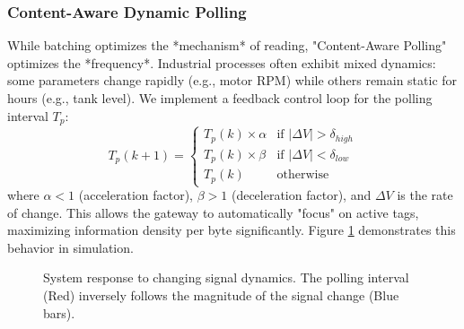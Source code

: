 \documentclass[journal]{IEEEtran}
\begin{document}
\subsubsection{Content-Aware Dynamic Polling}
While batching optimizes the *mechanism* of reading, "Content-Aware Polling" optimizes the *frequency*. Industrial processes often exhibit mixed dynamics: some parameters change rapidly (e.g., motor RPM) while others remain static for hours (e.g., tank level).
We implement a feedback control loop for the polling interval $T_p$:
\begin{equation}
T_p(k+1) = \begin{cases} 
T_p(k) \times \alpha & \text{if } |\Delta V| > \delta_{high} \\
T_p(k) \times \beta & \text{if } |\Delta V| < \delta_{low} \\
T_p(k) & \text{otherwise}
\end{cases}
\end{equation}
where $\alpha < 1$ (acceleration factor), $\beta > 1$ (deceleration factor), and $\Delta V$ is the rate of change. This allows the gateway to automatically "focus" on active tags, maximizing information density per byte significantly. Figure \ref{fig:dynamic_poll} demonstrates this behavior in simulation.

\begin{figure}[htbp]
\centering
{}
\caption{System response to changing signal dynamics. The polling interval (Red) inversely follows the magnitude of the signal change (Blue bars).}
\label{fig:dynamic_poll}
\end{figure}
\end{document}
